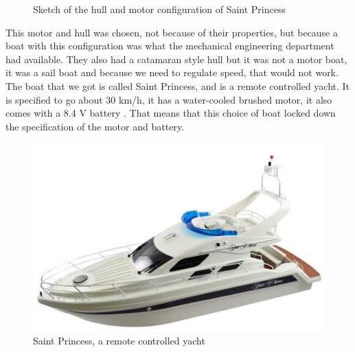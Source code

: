 \begin{figure}[H]
	\centering
	\hfill
	\caption{Sketch of the hull and motor configuration of Saint Princess}
\end{figure}
This motor and hull was chosen, not because of their properties, but because a boat with this configuration was what the mechanical engineering department had available. They also had a catamaran style hull but it was not a motor boat, it was a sail boat and because we need to regulate speed, that would not work. The boat that we got is called Saint Princess, and is a remote controlled yacht. It is specified to go about 30 km/h, it has a water-cooled brushed motor, it also comes with a 8.4 V battery \cite{saint_princess}. That means that this choice of boat locked down the specification of the motor and battery.

\begin{figure}[H]
\centering
\includegraphics[width=1\linewidth]{Images/Design/saint_princess}
\caption{Saint Princess, a remote controlled yacht\cite{saint_princess}}
\label{fig:saintprincess}
\end{figure}


